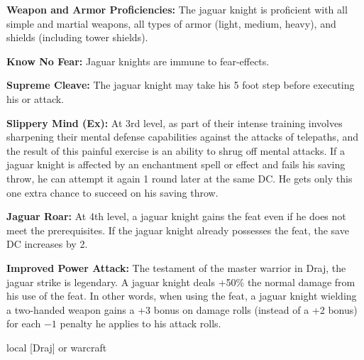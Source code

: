 {
\textbf{Weapon and Armor Proficiencies:} The jaguar knight is proficient with all simple and martial weapons, all types of armor (light, medium, heavy), and shields (including tower shields).

\textbf{Know No Fear:} Jaguar knights are immune to fear-effects.

\textbf{Supreme Cleave:} The jaguar knight may take his 5 foot step before executing his  or  attack.

\textbf{Slippery Mind (Ex):} At 3rd level, as part of their intense training involves sharpening their mental defense capabilities against the attacks of telepaths, and the result of this painful exercise is an ability to shrug off mental attacks. If a jaguar knight is affected by an enchantment spell or effect and fails his saving throw, he can attempt it again 1 round later at the same DC. He gets only this one extra chance to succeed on his saving throw.

\textbf{Jaguar Roar:} At 4th level, a jaguar knight gains the  feat even if he does not meet the prerequisites. If the jaguar knight already possesses the  feat, the save DC increases by 2.

\textbf{Improved Power Attack:} The testament of the master warrior in Draj, the jaguar strike is legendary. A jaguar knight deals +50\% the normal damage from his use of the  feat. In other words, when using the  feat, a jaguar knight wielding a two-handed weapon gains a +3 bonus on damage rolls (instead of a +2 bonus) for each $-1$ penalty he applies to his attack rolls.
}
{}
{local [Draj] or warcraft}
{}
{}
{}